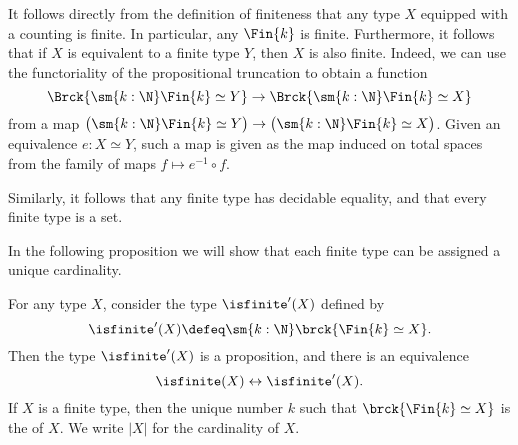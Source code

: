 \begin{rmk}
  It follows directly from the definition of finiteness that any type $X$ equipped with a counting is finite. In particular, any $\Fin{k}$ is finite. Furthermore, it follows that if $X$ is equivalent to a finite type $Y$, then $X$ is also finite. Indeed, we can use the functoriality of the propositional truncation to obtain a function
  \begin{equation*}
    \Brck{\sm{k:\N}\Fin{k}\simeq Y}\to\Brck{\sm{k:\N}\Fin{k}\simeq X}
  \end{equation*}
  from a map $\big(\sm{k:\N}\Fin{k}\simeq Y\big)\to\big(\sm{k:\N}\Fin{k}\simeq X\big)$. Given an equivalence $e:X\simeq Y$, such a map is given as the map induced on total spaces from the family of maps $f\mapsto e^{-1}\circ f$.

  Similarly, it follows that any finite type has decidable equality, and that every finite type is a set.
\end{rmk}

In the following proposition we will show that each finite type can be assigned a unique cardinality.

\begin{thm}
  For any type $X$, consider the type $\isfinite'(X)$ defined by
  \begin{equation*}
    \isfinite'(X) \defeq \sm{k:\N}\brck{\Fin{k}\simeq X}.
  \end{equation*}
  Then the type $\isfinite'(X)$ is a proposition, and there is an equivalence
  \begin{equation*}
    \isfinite(X)\leftrightarrow\isfinite'(X).
  \end{equation*}
  If $X$ is a finite type, then the unique number $k$ such that $\brck{\Fin{k}\simeq X}$ is the  of $X$. We write $|X|$ for the cardinality of $X$.
\end{thm}

